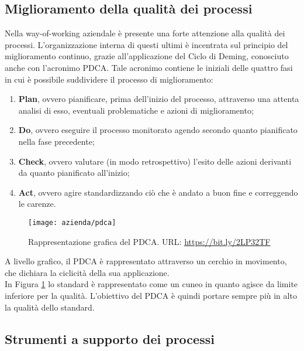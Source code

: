 \subsection{Miglioramento della qualità dei processi}
Nella way-of-working aziendale è presente una forte attenzione alla qualità dei processi. L'organizzazione interna di questi ultimi è incentrata sul principio del miglioramento continuo, grazie all'applicazione del Ciclo di Deming, conosciuto anche con l'acronimo PDCA. Tale acronimo contiene le iniziali delle quattro fasi in cui è possibile suddividere il processo di miglioramento: \begin{enumerate}
	\item \textbf{Plan}, ovvero pianificare, prima dell'inizio del processo, attraverso una attenta analisi di esso, eventuali problematiche e azioni di miglioramento;
	\item \textbf{Do}, ovvero eseguire il processo monitorato agendo secondo quanto pianificato nella fase precedente;
	\item \textbf{Check}, ovvero valutare (in modo retrospettivo) l'esito delle azioni derivanti da quanto pianificato all'inizio;
	\item \textbf{Act}, ovvero agire standardizzando ciò che è andato a buon fine e correggendo le carenze.
\end{enumerate}
\begin{figure}[!h] 
	\centering 
	\texttt{[image: azienda/pdca]} 
	\caption{Rappresentazione grafica del PDCA. URL: \url{https://bit.ly/2LP32TF} }
	\label{figura:pdca}
\end{figure}
A livello grafico, il PDCA è rappresentato attraverso un cerchio in movimento, che dichiara la ciclicità della sua applicazione.\\
In Figura \ref{figura:pdca} lo standard è rappresentato come un cuneo in quanto agisce da limite inferiore per la qualità. L'obiettivo del PDCA è quindi portare sempre più in alto la qualità dello standard.

\subsection{Strumenti a supporto dei processi}

